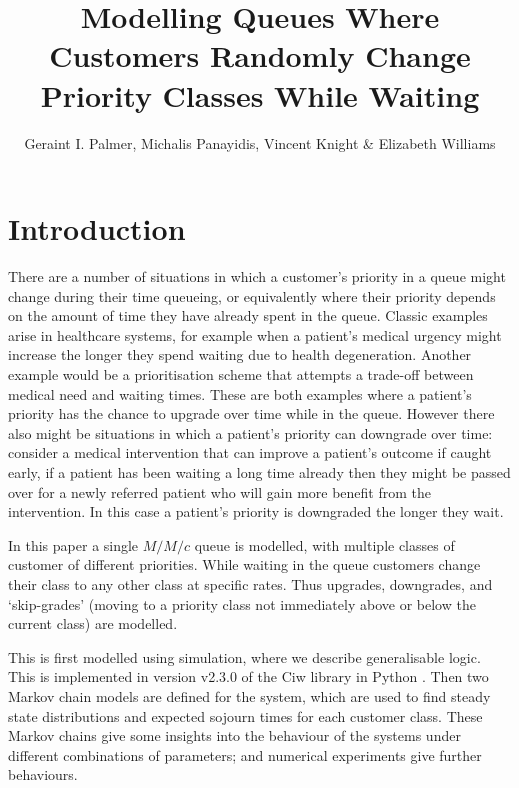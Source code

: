 \documentclass{article}
\title{Modelling Queues Where Customers Randomly Change Priority Classes While Waiting}
\author{Geraint I. Palmer, Michalis Panayidis, Vincent Knight \& Elizabeth Williams}
\date{}
\begin{document}
\maketitle

\section{Introduction}
There are a number of situations in which a customer's priority in a queue might
change during their time queueing, or equivalently where their priority depends
on the amount of time they have already spent in the queue.
Classic examples arise in healthcare systems, for example when a patient's
medical urgency might increase the longer they spend waiting due to health
degeneration. Another example would be a prioritisation scheme that attempts a
trade-off between medical need and waiting times.
These are both examples where a patient's priority has the chance to upgrade
over time while in the queue.
However there also might be situations in which a patient's priority can
downgrade over time: consider a medical intervention that can improve a
patient's outcome if caught early, if a patient has been waiting a long time
already then they might be passed over for a newly referred patient who will
gain more benefit from the intervention. In this case a patient's priority is
downgraded the longer they wait.

In this paper a single $M/M/c$ queue is modelled, with multiple classes of
customer of different priorities. While waiting in the queue customers change
their class to any other class at specific rates. Thus upgrades, downgrades, and
`skip-grades' (moving to a priority class not immediately above or below the
current class) are modelled.

This is first modelled using simulation, where we describe generalisable logic.
This is implemented in version v2.3.0 of the Ciw library in Python
\cite{palmer19}.
Then two Markov chain models are defined for the system, which are used to find
steady state distributions and expected sojourn times for each customer class.
These Markov chains give some insights into the behaviour of the systems under
different combinations of parameters; and numerical experiments give further
behaviours.
\end{document}
